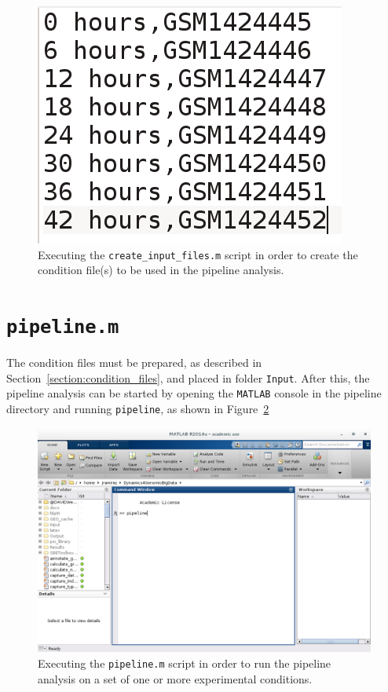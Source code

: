 \documentclass[final,letterpaper,twoside,12pt]{article}
\begin{document}
\begin{figure}[h]
\includegraphics[width=\textwidth]{create_files_11}
\caption{Executing the \texttt{create\_input\_files.m} script in order to create the condition file(s) to be used in the pipeline analysis.}
\label{figure:create_files_11}
\end{figure}

\section{\texttt{pipeline.m}}

\par The condition files must be prepared, as described in Section~\ref{section:condition_files}, and placed in folder \texttt{Input}. After this, the pipeline analysis can be started by opening the \texttt{MATLAB} console in the pipeline directory and running \texttt{pipeline}, as shown in Figure~\ref{figure:pipeline1}

\begin{figure}[h]
\includegraphics[width=\textwidth]{pln1}
\caption{Executing the \texttt{pipeline.m} script in order to run the pipeline analysis on a set of one or more experimental conditions.}
\label{figure:pipeline1}
\end{figure}
\end{document}

